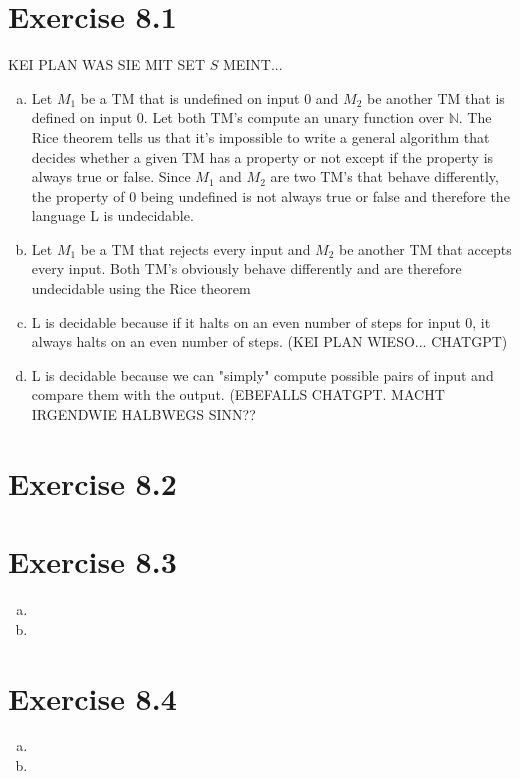 \documentclass{article} %
\newcommand{\homeworkNumber}{8}
\begin{document}
\section*{Exercise \homeworkNumber.1}

KEI PLAN WAS SIE MIT SET $S$ MEINT...

\begin{enumerate}[(a)]
\item Let $M_1$ be a TM that is undefined on input $0$ and $M_2$ be another TM that is defined on input $0$. Let both TM's compute an unary function over $\mathbb{N}$. The Rice theorem tells us that it's impossible to write a general algorithm that decides whether a given TM has a property or not except if the property is always true or false. Since $M_1$ and $M_2$ are two TM's that behave differently, the property of $0$ being undefined is not always true or false and therefore the language L is undecidable.\\

\item Let $M_1$ be a TM that rejects every input and $M_2$ be another TM that accepts every input. Both TM's obviously behave differently and are therefore undecidable using the Rice theorem\\

\item L is decidable because if it halts on an even number of steps for input 0, it always halts on an even number of steps. (KEI PLAN WIESO... CHATGPT)\\

\item L is decidable because we can "simply" compute possible pairs of input and compare them with the output. (EBEFALLS CHATGPT. MACHT IRGENDWIE HALBWEGS SINN??\\
\end{enumerate}

\section*{Exercise \homeworkNumber.2}

\section*{Exercise \homeworkNumber.3}
\begin{enumerate}[(a)]
\item
\item
\end{enumerate}

\section*{Exercise \homeworkNumber.4}
\begin{enumerate}[(a)]
\item
\item
\end{enumerate}
\end{document}
